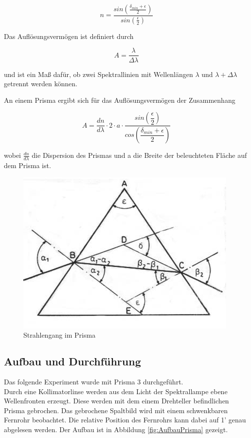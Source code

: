 \documentclass[12pt,a4paper]{article}
\begin{document}
	\begin{equation}
	n = \frac{sin(\frac{\delta_{min}+\epsilon}{2})}{sin(\frac{\epsilon}{2})}
	\end{equation}
	
	Das Auflösungsvermögen ist definiert durch
	
	\begin{equation}
	A = \frac{\lambda}{\Delta \lambda}
	\end{equation} 
	
	und ist ein Maß dafür, ob zwei Spektrallinien mit Wellenlängen $\lambda$ und $\lambda + \Delta \lambda$ getrennt werden können.
	
	An einem Prisma ergibt sich für das Auflösungsvermögen der Zusammenhang
	
\begin{equation}
A = \dfrac{dn}{d\lambda}\cdot 2\cdot a\cdot\dfrac{sin\left(\dfrac{\epsilon}{2}\right)}{cos\left(\dfrac{\delta_{min}+\epsilon}{2}\right)}
\label{eq:Auflosung}
\end{equation}
	
	wobei $\frac{dn}{d\lambda}$ die Dispersion des Prismas und a die Breite der beleuchteten Fläche auf dem Prisma ist.

\begin{figure}
\includegraphics[scale=1.0]{Bilder/prisma}
\caption{Strahlengang im Prisma}
\label{fig:Prisma}
\end{figure}

	
	
\subsection{Aufbau und Durchführung}
Das folgende Experiment wurde mit Prisma 3 durchgeführt.\\
Durch eine Kollimatorlinse werden aus dem Licht der Spektrallampe ebene Wellenfronten erzeugt. Diese werden mit dem einem Drehteller befindlichen Prisma gebrochen. Das gebrochene Spaltbild wird mit einem schwenkbaren Fernrohr beobachtet. Die relative Position des Fernrohrs kann dabei auf 1' genau abgelesen werden.
Der Aufbau ist in Abbildung \ref{fig:AufbauPrisma} gezeigt.
	
\end{document}

